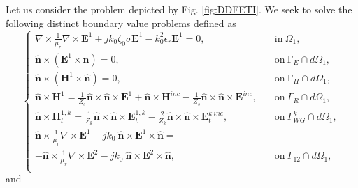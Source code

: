 Let us consider the problem depicted by Fig. \ref{fig:DDFETI}. We seek to solve the following distinct boundary value problems defined as
%
\begin{equation}
\label{eq:FETID1}
\left\lbrace
\begin{aligned}
\nabla \times \frac{1}{\mu_r} \nabla \times {\mathbf{E}^1} + j k_0 \zeta_0 \sigma {\mathbf{E}^1} - k_0^2 \epsilon_r {\mathbf{E}^1} = 0,& \quad \mathrm{in} \ \Omega_1,\\[10pt]
\hat{\mathbf{n}} \times ( {\mathbf{E}^1} \times \hat{\mathbf{n}}) = 0, &\quad \mathrm{on} \ \mathrm{\Gamma}_E \cap d\Omega_1, \\[5pt]
\hat{\mathbf{n}} \times ( {\mathbf{H}^1} \times \hat{\mathbf{n}}) = 0, &\quad  \mathrm{on} \ \mathrm{\Gamma}_{H} \cap d\Omega_1, \\[5pt]
\hat{\mathbf{n}} \times \mathbf{H}^1 = \frac{1}{Z_s} \hat{\mathbf{n}} \times \hat{\mathbf{n}} \times \mathbf{E}^1 + \hat{\mathbf{n}} \times \mathbf{H}^{inc} - \frac{1}{Z_s} \hat{\mathbf{n}} \times \hat{\mathbf{n}} \times \mathbf{E}^{inc}, &\quad \mathrm{on} \ \Gamma_{R} \cap d\Omega_1, \\[5pt]
\hat{\mathbf{n}} \times \mathbf{H}_t^{1,k} = \frac{1}{Z_k} \hat{\mathbf{n}} \times \hat{\mathbf{n}} \times \mathbf{E}_t^{1,k} - \frac{2}{Z_k} \hat{\mathbf{n}} \times \hat{\mathbf{n}} \times \mathbf{E}_t^{k \ inc}, &\quad \mathrm{on} \ \Gamma_{WG}^k \cap d\Omega_1,\\[5pt]
\hat{\mathbf{n}} \times \frac{1}{\mu_r} \nabla \times \mathbf{E}^1 - jk_0 \ \hat{\mathbf{n}} \times \mathbf{E}^1 \times \hat{\mathbf{n}} = \qquad \qquad &\\ - \hat{\mathbf{n}} \times \frac{1}{\mu_r} \nabla \times \mathbf{E}^2 - jk_0 \ \hat{\mathbf{n}} \times \mathbf{E}^2 \times \hat{\mathbf{n}},  &\quad \mathrm{on} \ \Gamma_{12} \cap d\Omega_1, \\[5pt]
\end{aligned}
\right.
\end{equation}
%
\noindent and 
%

